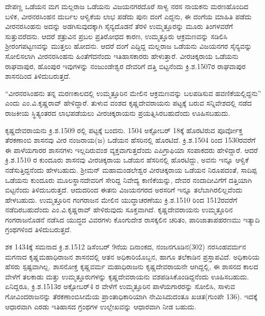 ದೇಪಣ್ಣ ಒಡೆಯನ ಮಗ ಮಲ್ಲರಾಜ ಒಡೆಯನು ವಿಜಯನಗರದೊರೆ ಸಾಳ್ವ ನರಸ ನಾಯಕನು ಮರಣಹೊಂದಿದ ಬಳಿಕ, ವೀರನರಸಿಂಹನ ದುರ್ಬಲ ಆಳ್ವಿಕೆಯ ಲಾಭ ಪಡೆದು ಪುನಃ ದಂಗೆ ಎದ್ದನು, ಈ ದಂಗೆಯ ಮಾಹಿತಿ ಪಡೆದು ವೀರನರಸಿಂಹನು ಅದನ್ನು ಅಡಗಿಸುವುದಕ್ಕಾಗಿ ಸೈನ್ಯದೊಡನೆ ತೆರಳಿ ಉಮ್ಮತ್ತೂರನ್ನು ಮೂರು ತಿಂಗಳವರೆಗೆ ಸುತ್ತುವರೆದನು. ಆದರೆ ಶತ್ರುವಿನ ಪ್ರಬಲ ಪ್ರತಿರೋಧದ ಕಾರಣ, ಉಮ್ಮತ್ತೂರು ಆಕ್ರಮಣವನ್ನು ಸಡಿಲಿಸಿ ಶ‍್ರೀರಂಗಪಟ್ಟಣವನ್ನು ಮುತ್ತಲು ಹೋದನು. ಆದರೆ ದಂಗೆ ಎದ್ದಿದ್ದ ಮಲ್ಲರಾಜ ಒಡೆಯನು ವಿಜಯನಗರ ಸೈನ್ಯವನ್ನು ಸೋಲಿಸಲಾಗಿ ವೀರನರಸಿಂಹನು ಹಿಂತೆಗೆದನೆಂದು ಇತಿಹಾಸಕಾರರು ಹೇಳುತ್ತಾರೆ. ವೀರಚಿಕ್ಕರಾಯ ಒಡೆಯನು ರಾಘವಾಪುರ, ಹೊಂಪುರ ಇವುಗಳನ್ನು ನಂಜುಂಡೇಶ್ವರ ದೇವರಿಗೆ ದತ್ತಿ ಬಿಟ್ಟನೆಂದು ಕ್ರಿ.ಶ.1507ರ ರಾಘವಾಪುರ ಶಾಸನದಿಂದ ತಿಳಿದುಬರುತ್ತದೆ.

“ವೀರನರಸಿಂಹನು ತನ್ನ ಮರಣಕಾಲದಲ್ಲಿ ಉಮ್ಮತ್ತೂರಿನ ಮೇಲಿನ ಆಕ್ರಮಣವನ್ನು ಬಲಪಡಿಸುವ ಹವಣಿಕೆಯಲ್ಲಿದ್ದನು” ಎಂದು ಎಂ.ವಿ.ಕೃಷ್ಣರಾವ್​ ಹೇಳಿದ್ದಾರೆ. ತುಳುವ ವಂಶದ ಕೃಷ್ಣದೇವರಾಯನು ಪಟ್ಟಕ್ಕೆ ಬರುವ ಸನ್ನಿವೇಶದಲ್ಲಿ ನಡೆದ ರಾಜಕೀಯ ಸ್ಥಿತ್ಯಂತರದ ಲಾಭಪಡೆಯಲು ವೀರಚಿಕ್ಕರಾಯನು ಪ್ರಯತ್ನಿಸಿರಬಹುದೆಂದು ಊಹಿಸಬಹುದು.

ಕೃಷ್ಣದೇವರಾಯನು ಕ್ರಿ.ಶ.1509 ರಲ್ಲಿ ಪಟ್ಟಕ್ಕೆ ಬಂದನು. 1504 ಅಕ್ಟೋಬರ್​ 18ಕ್ಕೆ ಹೊರಟಿರುವ ಪೂರ್ವೋಕ್ತ ತೆರಕಣಾಂಬಿ ಶಾಸನವು ವೀರ ನಂಜರಾಯ(ಜ) ಒಡೆಯನ ಹೆಸರಿನಲ್ಲಿ ಹೊರಟಿದೆ. ಕ್ರಿ.ಶ.1504 ರಿಂದ 1530ರವರೆಗೆ ಈ ಪಾಳೆಯಗಾರರ ಶಾಸನಗಳು ಇಲ್ಲದಿರುವಂಶ ವ್ಯಕ್ತವಾಗುತ್ತದೆಂದು ಎಪಿಗ್ರಾಫಿಯಾ ಸಂಪಾಕದರು ಹೇಳಿದ್ದಾರೆ. ಆದರೆ ಕ್ರಿ.ಶ.1510 ರ ಕುಂದೂರು ಶಾಸನವು ವೀರಚಿಕ್ಕರಾಯ ಒಡೆಯನ ಹೆಸರಿನಲ್ಲಿ ಹೊರಟಿದ್ದು, ಅವನು ಇನ್ನೂ ಆಳ್ವಿಕೆ ನಡೆಸುತ್ತಿದ್ದನೆಂದು ಹೇಳಬಹುದು. ಶ‍್ರೀಮನ್​ ಮಹಾಮಂಡಲೇಶ್ವರ ವೀರಚಿಕ್ಕರಾಯ ಒಡೆಯನ ನಿರೂಪದಂತೆ, ಸಾದಿಪ್ಪ ಒಡೆಯನು ಕುಂದೂರು ಮೂಲಸ್ಥಾನದೇವರಿಗೆ ಸೇರಿದ್ದ ನಿವೇದ್ಯ ಕಾಣಿಕೆಯನ್ನು, ದೇವರ ನಂದಾದೀವಿಗೆಗೆ ದತ್ತಿಯಾಗಿ ಬಿಟ್ಟನೆಂದು ತಿಳಿದುಬರುತ್ತದೆ. ಆದುದರಿಂದ ಈತನು ವಿಜಯನಗರದ ಅರಸರಿಗೆ ಇನ್ನೂ ತಲೆಬಾಗಿರಲಿಲ್ಲವೆಂದು ಹೇಳಬಹುದು. \textbf{ }ಉಮ್ಮತ್ತೂರಿನ ಗಂಗರಾಜನ ಮೇಲಿನ ಯುದ್ಧಾಚರಣೆಯು ಕ್ರಿ.ಶ.1510 ರಿಂದ 1512ರವರೆಗೆ ನಡೆದಿರಬಹುದೆಂದು ಎಂ.ವಿ.ಕೃಷ್ಣರಾವ್​ ಹೇಳಿರುವುದು ಸೂಕ್ತವಾಗಿದೆ. ಕೃಷ್ಣದೇವರಾಯನು ಉಮ್ಮತ್ತೂರಿನ ಗಂಗರಾಜನೊಡನೆ ನಡೆಸಿದ ಯುದ್ಧದ ವಿವರಗಳು ಕೊಂಗುದೇಶ ರಾಸಕ್ಕಲಿನ ಚರಿತಂ, ಪಾರಿಜಾತಾಪಹರಣಮು ಇತ್ಯಾದಿ ಗ್ರಂಥಗಳಿಂದ ತಿಳಿದುಬರುತ್ತದೆ.

ಶಕ 1434ಕ್ಕೆ ಸಮನಾದ ಕ್ರಿ.ಶ.1512 ಡಿಸೆಂಬರ್​ 9ನೆಯ ದಿನಾಂಕದ, ನಂಜನಗೂಡಿನ(302) ನರಸಿಂಹವರ್ಮನ ಮಗನಾದ ಕೃಷ್ಣಮಹಾಧಿರಾಜನ ಶಾಸನದಲ್ಲಿ ಆತನ ಅಧಿಕಾರಿಯೊಬ್ಬನ, ಹಾಗೂ ತಲೆಕಾಡಿನ ಪ್ರಸ್ತಾಪವಿದೆ. ಅಧಿಕಾರಿಯ ಹೆಸರು ಸ್ಪಷ್ಟವಾಗಿಲ್ಲ. ಶಾಸನೋಕ್ತ ಕೃಷ್ಣವರ್ಮ ಮಹಾಧಿರಾಜನು ಕೃಷ್ಣದೇವರಾಯನೇ ಆಗಿದ್ದಲ್ಲಿ, ಈ ಶಾಸನದ ಕಾಲದ ವೇಳೆಗೆ ತಲಕಾಡು ಮತ್ತು ಉಮ್ಮತ್ತೂರುಗಳನ್ನು ಕೃಷ್ಣದೇವರಾಯನು ವಶಪಡಿಸಿಕೊಂಡಿದ್ದನೆಂದು ಊಹಿಸಬಹುದು. ಏನಿದ್ದರೂ, ಕ್ರಿ.ಶ.1513ರ ಅಕ್ಟೋಬರ್​4 ರ ವೇಳೆಗೆ ಉಮ್ಮತ್ತೂರಿನ ಪಾಳೆಯಗಾರರನ್ನು ಸೋಲಿಸಿ, ಸಾಳುವ ಗೋವಿಂದರಾಜನನ್ನು ತೆರಕಣಾಂಬಿಸೀಮೆಯ ಪ್ರಾಂತಾಧಿಕಾರಿಯಾಗಿ ನೇಮಿಸಿದುದಂತೂ ಖಚಿತ(ಗುಂಪೇ 136). ಇದಕ್ಕೆ ಆಧಾರವಾಗಿ ಎರಡು ಇತಿಹಾಸದ ಗ್ರಂಥಗಳ ಉಲ್ಲೇಖವನ್ನು ಆಧಾರವಾಗಿ ನೀಡ ಬಹುದು.

